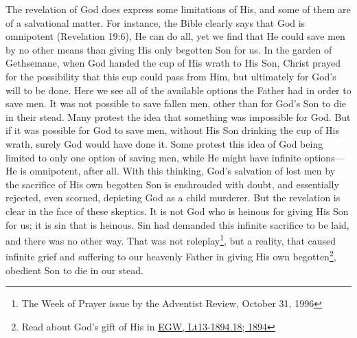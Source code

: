 The revelation of God does express some limitations of His, and some of them are of a salvational matter. For instance, the Bible clearly says that God is omnipotent (Revelation 19:6), He can do all, yet we find that He could save men by no other means than giving His only begotten Son for us. In the garden of Gethsemane, when God handed the cup of His wrath to His Son, Christ prayed for the possibility that this cup could pass from Him, but ultimately for God's will to be done. Here we see all of the available options the Father had in order to save men. It was not possible to save fallen men, other than for God’s Son to die in their stead. Many protest the idea that something was impossible for God. But if it was possible for God to save men, without His Son drinking the cup of His wrath, surely God would have done it. Some protest this idea of God being limited to only one option of saving men, while He might have infinite options—He is omnipotent, after all. With this thinking, God’s salvation of lost men by the sacrifice of His own begotten Son is enshrouded with doubt, and essentially rejected, even scorned, depicting God as a child murderer. But the revelation is clear in the face of these skeptics. It is not God who is heinous for giving His Son for us; it is sin that is heinous. Sin had demanded this infinite sacrifice to be laid, and there was no other way. That was not roleplay\footnote{The Week of Prayer issue by the Adventist Review, October 31, 1996}, but a reality, that caused infinite grief and suffering to our heavenly Father in giving His own begotten\footnote{Read about God’s gift of His  in \href{https://egwwritings.org/?ref=en_Lt13-1894.18&para=5486.24}{{EGW, Lt13-1894.18; 1894}}}, obedient Son to die in our stead.


